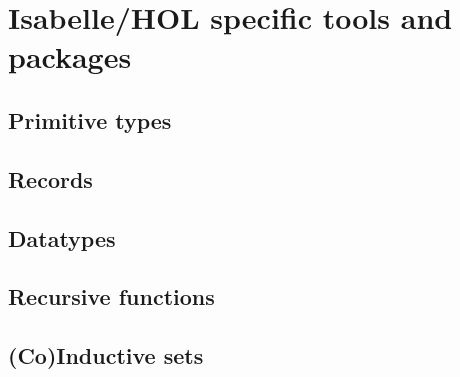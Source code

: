 
\chapter{Isabelle/HOL specific tools and packages}

\section{Primitive types}

\section{Records}

\section{Datatypes}

\section{Recursive functions}

\section{(Co)Inductive sets}


